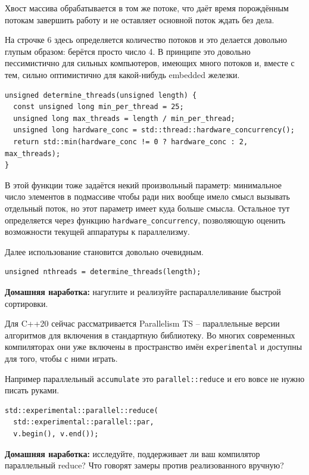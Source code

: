 \documentclass[a4paper,12pt,oneside]{book}
\begin{document}
Хвост массива обрабатывается в том же потоке, что даёт время порождённым потокам завершить работу и не оставляет основной поток ждать без дела.

На строчке 6 здесь определяется количество потоков и это делается довольно глупым образом: берётся просто число 4. В принципе это довольно пессимистично для сильных компьютеров, имеющих много потоков и, вместе с тем, сильно оптимистично для какой-нибудь embedded железки.

\begin{lstlisting}
unsigned determine_threads(unsigned length) {
  const unsigned long min_per_thread = 25;
  unsigned long max_threads = length / min_per_thread;
  unsigned long hardware_conc = std::thread::hardware_concurrency();
  return std::min(hardware_conc != 0 ? hardware_conc : 2, max_threads);
}
\end{lstlisting}

В этой функции тоже задаётся некий произвольный параметр: минимальное число элементов в подмассиве чтобы ради них вообще имело смысл вызывать отдельный поток, но этот параметр имеет куда больше смысла. Остальное тут определяется через функцию \lstinline!hardware_concurrency!, позволяющую оценить возможности текущей аппаратуры к параллелизму.

Далее использование становится довольно очевидным.

\begin{lstlisting}
unsigned nthreads = determine_threads(length);
\end{lstlisting}

\textbf{Домашняя наработка:} нагуглите и реализуйте распараллеливание быстрой сортировки.

Для C++20 сейчас рассматривается Parallelism TS -- параллельные версии алгоритмов для включения в стандартную библиотеку. Во многих современных компиляторах они уже включены в пространство имён \lstinline!experimental! и доступны для того, чтобы с ними играть.

Например параллельный \lstinline!accumulate! это \lstinline!parallel::reduce! и его вовсе не нужно писать руками.

\begin{lstlisting}
std::experimental::parallel::reduce(
  std::experimental::parallel::par, 
  v.begin(), v.end());
\end{lstlisting}

\textbf{Домашняя наработка:} исследуйте, поддерживает ли ваш компилятор параллельный reduce? Что говорят замеры против реализованного вручную?
\end{document}
